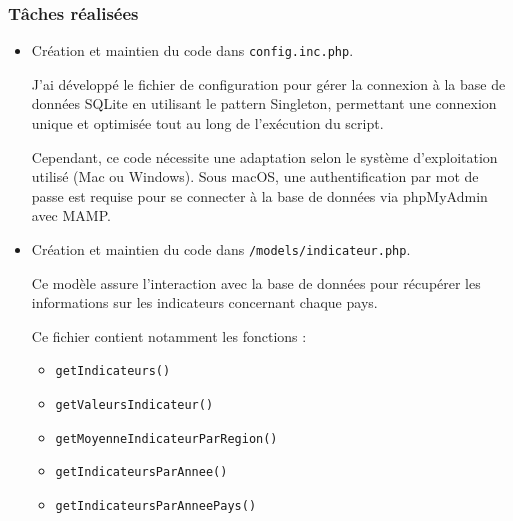 \documentclass[11pt]{article}
\begin{document}
\subsubsection*{Tâches réalisées}
\begin{itemize}

    \vspace{0.2cm}
    
    \item Création et maintien du code dans \texttt{config.inc.php}.

    \vspace{0.2cm}
    
    J'ai développé le fichier de configuration pour gérer la connexion à la base de données SQLite en utilisant le pattern Singleton, permettant une connexion unique et optimisée tout au long de l'exécution du script.

    \vspace{0.2cm}
    
    Cependant, ce code nécessite une adaptation selon le système d’exploitation utilisé (Mac ou Windows). Sous macOS, une authentification par mot de passe est requise pour se connecter à la base de données via phpMyAdmin avec MAMP.

    \vspace{0.2cm}
    
    \item Création et maintien du code dans \texttt{/models/indicateur.php}. 
    
    \vspace{0.2cm}
    
    Ce modèle assure l’interaction avec la base de données pour récupérer les informations sur les indicateurs concernant chaque pays. 

    \vspace{0.2cm}
    
    Ce fichier contient notamment les fonctions : 
    
    \vspace{0.05cm}
    
\begin{itemize}
    \item \texttt{getIndicateurs()}
    \item \texttt{getValeursIndicateur()}
    \item \texttt{getMoyenneIndicateurParRegion()}
    \item \texttt{getIndicateursParAnnee()}
    \item \texttt{getIndicateursParAnneePays()}
\end{itemize}
    

\end{itemize}
\end{document}
